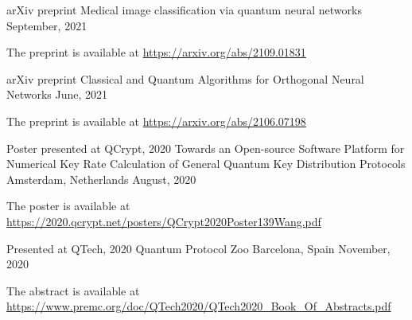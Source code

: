 

\begin{cventries}
  \cventry
    {arXiv preprint} %
    {Medical image classification via quantum neural networks
} %
    {} %
    {September, 2021} %
    {
      \begin{cvitems} %
        \item {The preprint is available at \href{https://arxiv.org/abs/2109.01831}{https://arxiv.org/abs/2109.01831}}
      \end{cvitems}
    }

  \cventry
    {arXiv preprint} %
    {Classical and Quantum Algorithms for Orthogonal Neural Networks} %
    {} %
    {June, 2021} %
    {
      \begin{cvitems} %
        \item {The preprint is available at \href{https://arxiv.org/abs/2106.07198}{https://arxiv.org/abs/2106.07198}}
      \end{cvitems}
    }

  \cventry
    {Poster presented at QCrypt, 2020} %
    {Towards an Open-source Software Platform for Numerical Key Rate Calculation of General Quantum Key Distribution Protocols} %
    {Amsterdam, Netherlands} %
    {August, 2020} %
    {
      \begin{cvitems} %
        \item {The poster is available at \href{https://2020.qcrypt.net/posters/QCrypt2020Poster139Wang.pdf}{https://2020.qcrypt.net/posters/QCrypt2020Poster139Wang.pdf}}
      \end{cvitems}
    }

  \cventry
    {Presented at QTech, 2020} %
    {Quantum Protocol Zoo} %
    {Barcelona, Spain} %
    {November, 2020} %
    {
      \begin{cvitems} %
        \item {The abstract is available at \href{https://www.premc.org/doc/QTech2020/QTech2020_Book_Of_Abstracts.pdf}{https://www.premc.org/doc/QTech2020/QTech2020\_Book\_Of\_Abstracts.pdf}}
      \end{cvitems}
    }

\end{cventries}
